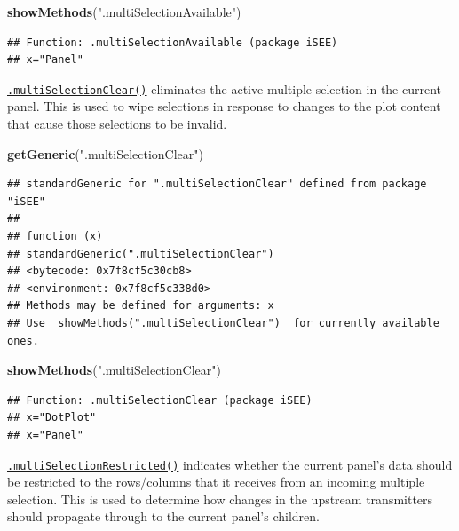\documentclass[
]{book}
\newenvironment{Shaded}{\begin{snugshade}}{\end{snugshade}}
\newcommand{\KeywordTok}[1]{\textcolor[rgb]{0.13,0.29,0.53}{\textbf{#1}}}
\newcommand{\NormalTok}[1]{#1}
\newcommand{\StringTok}[1]{\textcolor[rgb]{0.31,0.60,0.02}{#1}}
\begin{document}
\begin{Shaded}
\begin{Highlighting}[]
\KeywordTok{showMethods}\NormalTok{(}\StringTok{".multiSelectionAvailable"}\NormalTok{)}
\end{Highlighting}
\end{Shaded}

\begin{verbatim}
## Function: .multiSelectionAvailable (package iSEE)
## x="Panel"
\end{verbatim}

\href{https://isee.github.io/iSEE/reference/multi-select-generics.html}{\texttt{.multiSelectionClear()}} eliminates the active multiple selection in the current panel.
This is used to wipe selections in response to changes to the plot content that cause those selections to be invalid.

\begin{Shaded}
\begin{Highlighting}[]
\KeywordTok{getGeneric}\NormalTok{(}\StringTok{".multiSelectionClear"}\NormalTok{)}
\end{Highlighting}
\end{Shaded}

\begin{verbatim}
## standardGeneric for ".multiSelectionClear" defined from package "iSEE"
## 
## function (x) 
## standardGeneric(".multiSelectionClear")
## <bytecode: 0x7f8cf5c30cb8>
## <environment: 0x7f8cf5c338d0>
## Methods may be defined for arguments: x
## Use  showMethods(".multiSelectionClear")  for currently available ones.
\end{verbatim}

\begin{Shaded}
\begin{Highlighting}[]
\KeywordTok{showMethods}\NormalTok{(}\StringTok{".multiSelectionClear"}\NormalTok{)}
\end{Highlighting}
\end{Shaded}

\begin{verbatim}
## Function: .multiSelectionClear (package iSEE)
## x="DotPlot"
## x="Panel"
\end{verbatim}

\href{https://isee.github.io/iSEE/reference/multi-select-generics.html}{\texttt{.multiSelectionRestricted()}} indicates whether the current panel's data should be restricted to the rows/columns that it receives from an incoming multiple selection.
This is used to determine how changes in the upstream transmitters should propagate through to the current panel's children.
\end{document}
